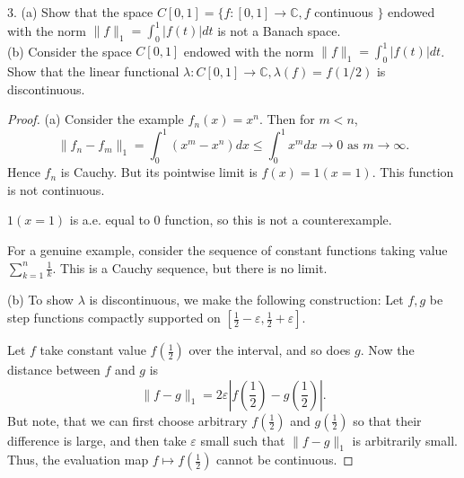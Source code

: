 \begin{problem}
3. (a) Show that the space $C[0,1]=\{f:[0,1] \rightarrow \mathbb{C}, f$ continuous $\}$ endowed with the norm $\|f\|_1=\int_0^1|f(t)| d t$ is not a Banach space.\\
(b) Consider the space $C[0,1]$ endowed with the norm $\|f\|_1=\int_0^1|f(t)| d t$. Show that the linear functional $\lambda: C[0,1] \rightarrow \mathbb{C}, \lambda(f)=f(1 / 2)$ is discontinuous.
\end{problem}
\begin{proof}
	(a) {\color{red} Consider the example $f_n(x) = x^n$}. Then for $m < n$,
	 \[
		\|f_n - f_m\|_1 = \int_0^1 (x^m - x^n) dx \le \int _0^1 x^m d x \to  0 \text{ as } m \to \infty 
	.\] 
	Hence $f_n$ is Cauchy. But its pointwise limit is $f(x) = 1(x = 1)$. This function is not continuous.

	\begin{correction}
		$1(x = 1)$ is a.e. equal to $0$ function, so this is not a counterexample.

		For a genuine example, consider the sequence of constant functions taking value $\sum_{k = 1}^n \frac{1}{k}$. This is a Cauchy sequence, but there is no limit.
	\end{correction}

	(b) To show $\lambda$ is discontinuous, we make the following construction: Let $f, g$ be step functions compactly supported on $[\frac{1}{2} - \varepsilon, \frac{1}{2} + \varepsilon]$.

	Let $f$ take constant value $f(\frac{1}{2})$ over the interval, and so does $g$. Now the distance between $f$ and $g$ is
	\[
		\|f - g\|_1 = 2 \varepsilon \left| f(\frac{1}{2}) - g(\frac{1}{2}) \right| 
	.\] 
	But note, that we can first choose arbitrary $f(\frac{1}{2})$ and $g(\frac{1}{2})$ so that their difference is large, and then take $\varepsilon$ small such that $\|f - g\|_1$ is arbitrarily small. Thus, the evaluation map $ f \mapsto  f(\frac{1}{2})$ cannot be continuous.
\end{proof}


